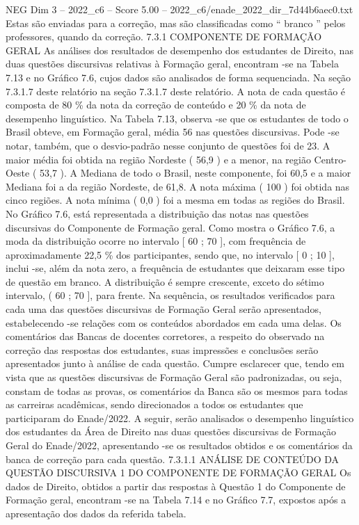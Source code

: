 \begin{textsample}{NEG Dim 3 – 2022\_c6 – Score 5.00 – 2022\_c6/enade\_2022\_dir\_7d44b6aec0.txt}
Estas são enviadas para a correção, mas são classificadas como “ branco ” pelos professores, quando da correção. 7.3.1 COMPONENTE DE FORMAÇÃO GERAL As análises dos resultados de desempenho dos estudantes de Direito, nas duas questões discursivas relativas à Formação geral, encontram -se na Tabela 7.13 e no Gráfico 7.6, cujos dados são analisados de forma sequenciada.
Na seção 7.3.1.7 deste relatório na seção 7.3.1.7 deste relatório.
A nota de cada questão é composta de 80 \% da nota da correção de conteúdo e 20 \% da nota de desempenho linguístico.
Na Tabela 7.13, observa -se que os estudantes de todo o Brasil obteve, em Formação geral, média 56 nas questões discursivas.
Pode -se notar, também, que o desvio-padrão nesse conjunto de questões foi de 23.
A maior média foi obtida na região Nordeste ( 56,9 ) e a menor, na região Centro-Oeste ( 53,7 ).
A Mediana de todo o Brasil, neste componente, foi 60,5 e a maior Mediana foi a da região Nordeste, de 61,8.
A nota máxima ( 100 ) foi obtida nas cinco regiões.
A nota mínima ( 0,0 ) foi a mesma em todas as regiões do Brasil.
No Gráfico 7.6, está representada a distribuição das notas nas questões discursivas do Componente de Formação geral.
Como mostra o Gráfico 7.6, a moda da distribuição ocorre no intervalo [ 60 ; 70 ], com frequência de aproximadamente 22,5 \% dos participantes, sendo que, no intervalo [ 0 ; 10 ], inclui -se, além da nota zero, a frequência de estudantes que deixaram esse tipo de questão em branco.
A distribuição é sempre crescente, exceto do sétimo intervalo, ( 60 ; 70 ], para frente.
Na sequência, os resultados verificados para cada uma das questões discursivas de Formação Geral serão apresentados, estabelecendo -se relações com os conteúdos abordados em cada uma delas.
Os comentários das Bancas de docentes corretores, a respeito do observado na correção das respostas dos estudantes, suas impressões e conclusões serão apresentados junto à análise de cada questão.
Cumpre esclarecer que, tendo em vista que as questões discursivas de Formação Geral são padronizadas, ou seja, constam de todas as provas, os comentários da Banca são os mesmos para todas as carreiras acadêmicas, sendo direcionados a todos os estudantes que participaram do Enade/2022.
A seguir, serão analisados o desempenho linguístico dos estudantes da Área de Direito nas duas questões discursivas de Formação Geral do Enade/2022, apresentando -se os resultados obtidos e os comentários da banca de correção para cada questão. 7.3.1.1 ANÁLISE DE CONTEÚDO DA QUESTÃO DISCURSIVA 1 DO COMPONENTE DE FORMAÇÃO GERAL Os dados de Direito, obtidos a partir das respostas à Questão 1 do Componente de Formação geral, encontram -se na Tabela 7.14 e no Gráfico 7.7, expostos após a apresentação dos dados da referida tabela.

\end{textsample}
